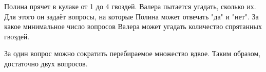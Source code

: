
Полина прячет в кулаке от 1 до 4 гвоздей. Валера пытается угадать, сколько их. 
Для этого он задаёт вопросы, на которые Полина может отвечать "да" и "нет". 
За какое минимальное число вопросов Валера может угадать количество спрятанных гвоздей.

\soultionSection

За один вопрос можно сократить перебираемое множество вдвое. Таким образом, достаточно двух вопросов.


